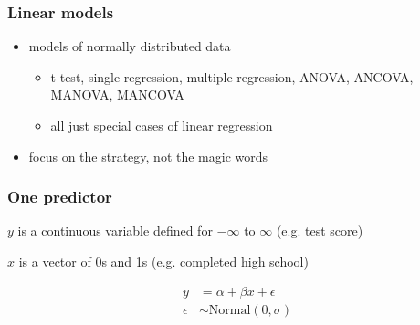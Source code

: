 \documentclass{beamer}
\begin{document}
\begin{frame}
  \frametitle{Linear models}

  \begin{itemize}
    \item models of normally distributed data
      \begin{itemize}
        \item t-test, single regression, multiple regression, ANOVA, ANCOVA, MANOVA, MANCOVA
        \item all just special cases of linear regression
      \end{itemize}
    \item focus on the strategy, not the magic words
  \end{itemize}
\end{frame}


\begin{frame}
  \frametitle{One predictor}

  \(y\) is a continuous variable defined for \(-\infty\) to \(\infty\) (e.g. test score)

  \(x\) is a vector of 0s and 1s (e.g. completed high school)

  \begin{align*}
    y &= \alpha + \beta x + \epsilon \\
    \epsilon &\sim \text{Normal}(0, \sigma)
  \end{align*}
\end{frame}
\end{document}
